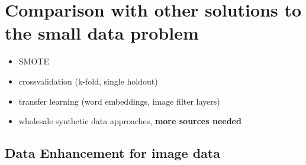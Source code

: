 \chapter{Comparison with other solutions to the small data problem}


\begin{itemize}
	\item \ac{SMOTE}
	\item crossvalidation (k-fold, single holdout)
	\item transfer learning (word embeddings, image filter layers)
	\item wholesale synthetic data approaches, \cite{ares_utility}  \textbf{more sources needed}
\end{itemize}


\section{Data Enhancement for image data} \label{enhace_imagedata}